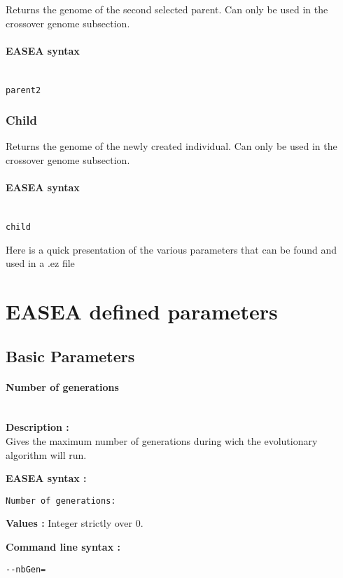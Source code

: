 \documentclass{book}
\begin{document}
Returns the genome of the second selected parent. Can only be used in
the crossover genome
subsection.

\paragraph{EASEA syntax}\label{easea-syntax-13}
~\\

\texttt{parent2}

\subsubsection{Child}\label{child}

Returns the genome of the newly created individual. Can only be used in
the crossover genome
subsection.

\paragraph{EASEA syntax}\label{easea-syntax-14}
~\\

\texttt{child}

Here is a quick presentation of the various parameters that can be found
and used in a .ez file
\section{EASEA defined parameters}
\subsection{Basic Parameters}\label{basic-parameters}

\paragraph{Number of generations}\label{number-of-generations}
~\\

\textbf{Description :}\\Gives the maximum number of generations during
wich the evolutionary algorithm will run.

\textbf{EASEA syntax :}

\texttt{Number~of~generations:}

\textbf{Values :} Integer strictly over 0.

\textbf{Command line syntax :}

\texttt{-{}-nbGen=}
\end{document}
